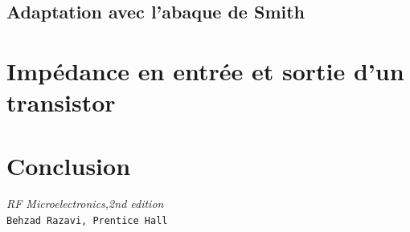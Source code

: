 \documentclass[a4paper]{article}
\begin{document}
\subsection{Adaptation avec l'abaque de Smith}

\section{Imp\'edance en entr\'ee et sortie d'un transistor}

\section{Conclusion}

\clearpage
{}

\begin{thebibliography}{9}

\textit{RF Microelectronics,2nd edition}\\
\texttt{Behzad Razavi, Prentice Hall}

\end{thebibliography}
\end{document}
